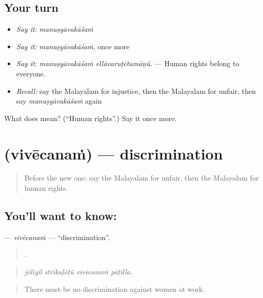 \subsection*{Your turn}
\begin{itemize}
\raggedright
  \item \emph{Say it:} \emph{manuṣyāvakāśaṁ}
  \item \emph{Say it:} \emph{manuṣyāvakāśaṁ}, once more
  \item \emph{Say it:} \emph{manuṣyāvakāśaṁ ellāvaruṭētumāṇŭ.} — Human rights belong to everyone.
  \item \emph{Recall:} say the Malayalam for injustice, then the Malayalam for unfair, then say \emph{manuṣyāvakāśaṁ} again
\end{itemize}

\begin{tcolorbox}[breakable,colback=teal!4,colframe=teal!35!black,title={Before you move on}]
What does  mean? (\textquotedblleft{}Human rights\textquotedblright{}.) Say it once more.
\end{tcolorbox}
\section[\texorpdfstring{\ml{വിവേചനം} (vivēcanaṁ)}{വിവേചനം (vivēcanaṁ)}]{ (vivēcanaṁ) — discrimination}

\label{lesson:ML-C416-vivecanam}



\begin{quote}
Before the new one: say the Malayalam for unfair, then the Malayalam for human rights.
\end{quote}

\subsection*{You'll want to know: }
\textbf{} — \emph{vivēcanaṁ} — \textquotedblleft{}discrimination\textquotedblright{}.

\begin{quote}
   .
\end{quote}

\begin{quote}
\emph{jōliyil strīkaḷōṭŭ vivēcanaṁ pāṭilla.}
\end{quote}

\begin{quote}
There must be no discrimination against women at work.
\end{quote}

